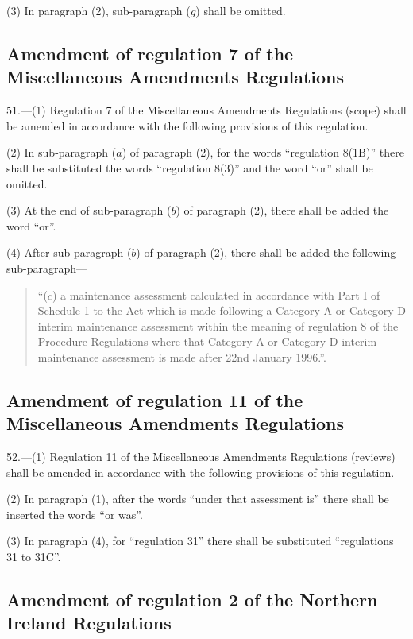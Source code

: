 \documentclass[12pt,a4paper]{article}
\begin{document}
(3) In paragraph (2), sub-paragraph ($g$) shall be omitted.

\subsection[51. Amendment of regulation 7 of the Miscellaneous Amendments Regulations]{Amendment of regulation 7 of the Miscellaneous Amendments Regulations}

51.—(1) Regulation 7 of the Miscellaneous Amendments Regulations (scope) shall be amended in accordance with the following provisions of this regulation.

(2) In sub-paragraph ($a$) of paragraph (2), for the words “regulation 8(1B)” there shall be substituted the words “regulation 8(3)” and the word “or” shall be omitted.

(3) At the end of sub-paragraph ($b$) of paragraph (2), there shall be added the word “or”.

(4) After sub-paragraph ($b$) of paragraph (2), there shall be added the following sub-paragraph—
\begin{quotation}
“($c$) a maintenance assessment calculated in accordance with Part I of Schedule 1 to the Act which is made following a Category A or Category D interim maintenance assessment within the meaning of regulation 8 of the Procedure Regulations where that Category A or Category D interim maintenance assessment is made after 22nd January 1996.”.
\end{quotation}

\subsection[52. Amendment of regulation 11 of the Miscellaneous Amendments Regulations]{\sloppy Amendment of regulation 11 of the Miscellaneous Amendments Regulations}

52.—(1) Regulation 11 of the Miscellaneous Amendments Regulations (reviews) shall be amended in accordance with the following provisions of this regulation.

(2) In paragraph (1), after the words “under that assessment is” there shall be inserted the words “or was”.

(3) In paragraph (4), for “regulation 31” there shall be substituted “regulations 31 to 31C”.

\subsection[53. Amendment of regulation 2 of the Northern Ireland Regulations]{\sloppy Amendment of regulation 2 of the Northern Ireland Regulations}
\end{document}
